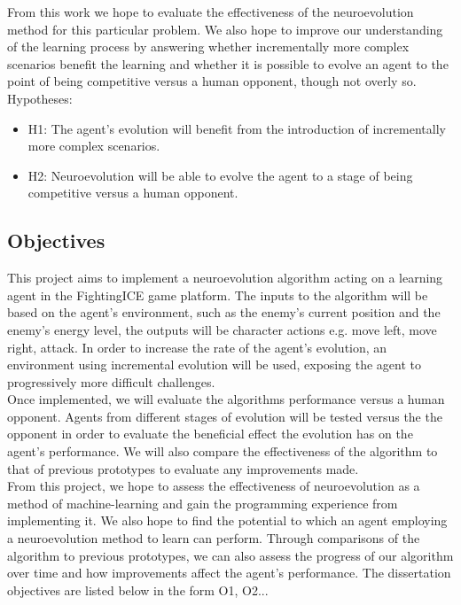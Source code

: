 \documentclass[12pt,a4paper]{article}
\begin{document}
From this work we hope to evaluate the effectiveness of the neuroevolution method for this particular problem. We also hope to improve our understanding of the learning process by answering whether incrementally more complex scenarios benefit the learning and whether it is possible to evolve an agent to the point of being competitive versus a human opponent, though not overly so.\\

Hypotheses:
\begin{itemize}
\item {H1: The agent's evolution will benefit from the introduction of incrementally more complex scenarios.}
\item {H2: Neuroevolution will be able to evolve the agent to a stage of being competitive versus a human opponent.}
\end{itemize}


\newpage
\subsection{Objectives}
This project aims to implement a neuroevolution algorithm acting on a learning agent in the FightingICE game platform. The inputs to the algorithm will be based on the agent's environment, such as the enemy's current position and the enemy's energy level, the outputs will be character actions e.g. move left, move right, attack. In order to increase the rate of the agent's evolution, an environment using incremental evolution will be used, exposing the agent to progressively more difficult challenges.\\

Once implemented, we will evaluate the algorithms performance versus a human opponent. Agents from different stages of evolution will be tested versus the the opponent in order to evaluate the beneficial effect the evolution has on the agent's performance. We will also compare the effectiveness of the algorithm to that of previous prototypes to evaluate any improvements made.\\

From this project, we hope to assess the effectiveness of neuroevolution as a method of machine-learning and gain the programming experience from implementing it. We also hope to find the potential to which an agent employing a neuroevolution method to learn can perform. Through comparisons of the algorithm to previous prototypes, we can also assess the progress of our algorithm over time and how improvements affect the agent's performance. The dissertation objectives are listed below in the form O1, O2...\\
\end{document}
